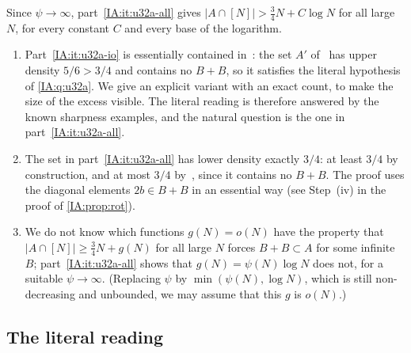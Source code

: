 Since $\psi\to\infty$, part~\ref{IA:it:u32a-all} gives $|A\cap[N]|>\frac34N+C\log N$ for all large
$N$, for every constant $C$ and every base of the logarithm.

\begin{remark}\label{IA:rem:u32a}
\begin{enumerate}[label=(\roman*)]
\item Part~\ref{IA:it:u32a-io} is essentially contained in~\cite{kousek2024infinite}: the set $A'$
of~\cite[Proposition~4.1]{kousek2024infinite} has upper density $5/6>3/4$ and contains no $B+B$,
so it satisfies the literal hypothesis of \cref{IA:q:u32a}. We give an explicit variant with an exact
count, to make the size of the excess visible. The literal reading is therefore answered by the
known sharpness examples, and the natural question is the one in part~\ref{IA:it:u32a-all}.
\item The set in part~\ref{IA:it:u32a-all} has lower density exactly $3/4$: at least $3/4$ by
construction, and at most $3/4$ by~\cite[Theorem~1.2]{kousek2024infinite}, since it contains no
$B+B$. The proof uses the diagonal elements $2b\in B+B$ in an
essential way (see Step~(iv) in the proof of \cref{IA:prop:rot}).
\item We do not know which functions $g(N)=o(N)$ have the property that $|A\cap[N]|\ge \frac34N+g(N)$
for all large $N$ forces $B+B\subset A$ for some infinite $B$; part~\ref{IA:it:u32a-all} shows that
$g(N)=\psi(N)\log N$ does not, for a suitable $\psi\to\infty$. (Replacing $\psi$ by
$\min(\psi(N),\log N)$, which is still non-decreasing and unbounded, we may assume that this $g$ is
$o(N)$.)
\end{enumerate}
\end{remark}

\subsection{The literal reading}

